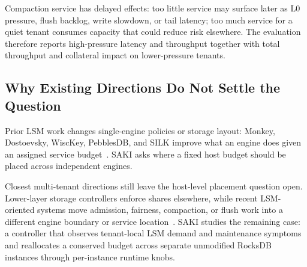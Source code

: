 Compaction service has delayed effects: too little service may surface later as
L0 pressure, flush backlog, write slowdown, or tail latency; too much service
for a quiet tenant consumes capacity that could reduce risk elsewhere. The
evaluation therefore reports high-pressure latency and throughput together with
total throughput and collateral impact on lower-pressure tenants.

\subsection{Why Existing Directions Do Not Settle the Question}

Prior LSM work changes single-engine policies or storage layout: Monkey,
Dostoevsky, WiscKey, PebblesDB, and SILK improve what an engine does given an
assigned service budget~\cite{dayan2017monkey,dayan2018dostoevsky,
lu2016wisckey,raju2017pebblesdb,balmau2019silk}. SAKI asks where a fixed host
budget should be placed across independent engines.

Closest multi-tenant directions still leave the host-level placement question
open. Lower-layer storage controllers enforce shares elsewhere, while recent
LSM-oriented systems move admission, fairness, compaction, or flush work into a
different engine boundary or service location~\cite{gulati2010mclock,
thereska2013ioflow,wang2026flexengine,griggs2026deltafairsharing,
yu2024caaslsm,ding2025dflush}. SAKI studies the remaining case: a controller
that observes tenant-local LSM demand and maintenance symptoms and reallocates
a conserved budget across separate unmodified RocksDB instances through
per-instance runtime knobs.
